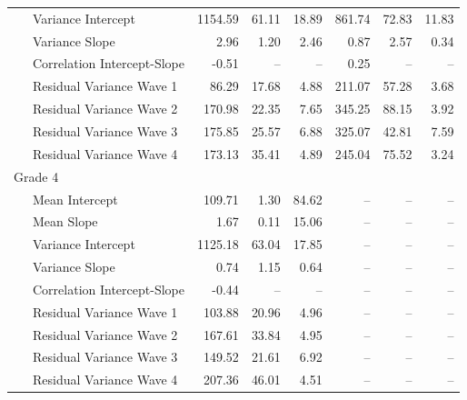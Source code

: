 \documentclass[
  english,
  man, fleqn, noextraspace]{apa6}
\begin{document}
\begin{appendix}
\begin{center}
\begin{ThreePartTable}
\begin{longtable}{lrrrrrr}
\ \ \ Variance Intercept & 1154.59 & 61.11 & 18.89 & 861.74 & 72.83 & 11.83\\
\ \ \ Variance Slope & 2.96 & 1.20 & 2.46 & 0.87 & 2.57 & 0.34\\
\ \ \ Correlation Intercept-Slope & -0.51 & -- & -- & 0.25 & -- & --\\
\ \ \ Residual Variance Wave 1 & 86.29 & 17.68 & 4.88 & 211.07 & 57.28 & 3.68\\
\ \ \ Residual Variance Wave 2 & 170.98 & 22.35 & 7.65 & 345.25 & 88.15 & 3.92\\
\ \ \ Residual Variance Wave 3 & 175.85 & 25.57 & 6.88 & 325.07 & 42.81 & 7.59\\
\ \ \ Residual Variance Wave 4 & 173.13 & 35.41 & 4.89 & 245.04 & 75.52 & 3.24\\
Grade 4 &  &  &  &  &  & \\
\ \ \ Mean Intercept & 109.71 & 1.30 & 84.62 & -- & -- & --\\
\ \ \ Mean Slope & 1.67 & 0.11 & 15.06 & -- & -- & --\\
\ \ \ Variance Intercept & 1125.18 & 63.04 & 17.85 & -- & -- & --\\
\ \ \ Variance Slope & 0.74 & 1.15 & 0.64 & -- & -- & --\\
\ \ \ Correlation Intercept-Slope & -0.44 & -- & -- & -- & -- & --\\
\ \ \ Residual Variance Wave 1 & 103.88 & 20.96 & 4.96 & -- & -- & --\\
\ \ \ Residual Variance Wave 2 & 167.61 & 33.84 & 4.95 & -- & -- & --\\
\ \ \ Residual Variance Wave 3 & 149.52 & 21.61 & 6.92 & -- & -- & --\\
\ \ \ Residual Variance Wave 4 & 207.36 & 46.01 & 4.51 & -- & -- & --\\
\bottomrule
\end{longtable}

\end{ThreePartTable}
\end{center}
\end{appendix}
\end{document}
